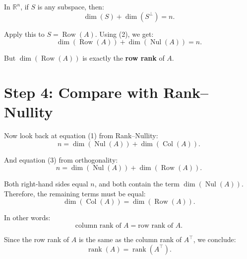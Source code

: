 In $ \mathbb{R}^n $, if $ S $ is any subspace, then:
\[
\dim(S) + \dim(S^\perp) = n.
\]

Apply this to $ S = \operatorname{Row}(A) $. Using (2), we get:
\[
\dim(\operatorname{Row}(A)) + \dim(\operatorname{Nul}(A)) = n.
\tag{3}
\]

But $ \dim(\operatorname{Row}(A)) $ is exactly the \textbf{row rank} of $ A $.

\section*{Step 4: Compare with Rank--Nullity}

Now look back at equation (1) from Rank--Nullity:
\[
n = \dim(\operatorname{Nul}(A)) + \dim(\operatorname{Col}(A)).
\]

And equation (3) from orthogonality:
\[
n = \dim(\operatorname{Nul}(A)) + \dim(\operatorname{Row}(A)).
\]

Both right-hand sides equal $ n $, and both contain the term $ \dim(\operatorname{Nul}(A)) $.  
Therefore, the remaining terms must be equal:
\[
\dim(\operatorname{Col}(A)) = \dim(\operatorname{Row}(A)).
\]

In other words:
\[
\text{column rank of } A = \text{row rank of } A.
\]

Since the row rank of $ A $ is the same as the column rank of $ A^\top $, we conclude:
\[
\operatorname{rank}(A) = \operatorname{rank}(A^\top).
\]




















\newpage







